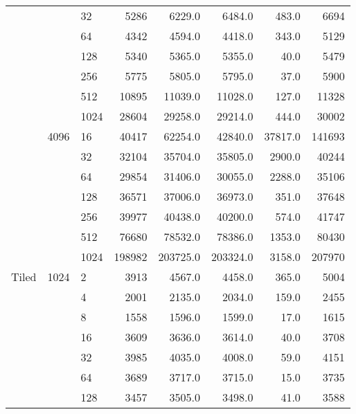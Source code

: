 \begin{tabular}{lllrrrrr}
           &      & 32 &                 5286 &    6229.0 &    6484.0 &    483.0 &    6694 \\
           &      & 64 &                 4342 &    4594.0 &    4418.0 &    343.0 &    5129 \\
           &      & 128 &                 5340 &    5365.0 &    5355.0 &     40.0 &    5479 \\
           &      & 256 &                 5775 &    5805.0 &    5795.0 &     37.0 &    5900 \\
           &      & 512 &                10895 &   11039.0 &   11028.0 &    127.0 &   11328 \\
           &      & 1024 &                28604 &   29258.0 &   29214.0 &    444.0 &   30002 \\
           & 4096 & 16 &                40417 &   62254.0 &   42840.0 &  37817.0 &  141693 \\
           &      & 32 &                32104 &   35704.0 &   35805.0 &   2900.0 &   40244 \\
           &      & 64 &                29854 &   31406.0 &   30055.0 &   2288.0 &   35106 \\
           &      & 128 &                36571 &   37006.0 &   36973.0 &    351.0 &   37648 \\
           &      & 256 &                39977 &   40438.0 &   40200.0 &    574.0 &   41747 \\
           &      & 512 &                76680 &   78532.0 &   78386.0 &   1353.0 &   80430 \\
           &      & 1024 &               198982 &  203725.0 &  203324.0 &   3158.0 &  207970 \\
Tiled & 1024 & 2 &                 3913 &    4567.0 &    4458.0 &    365.0 &    5004 \\
           &      & 4 &                 2001 &    2135.0 &    2034.0 &    159.0 &    2455 \\
           &      & 8 &                 1558 &    1596.0 &    1599.0 &     17.0 &    1615 \\
           &      & 16 &                 3609 &    3636.0 &    3614.0 &     40.0 &    3708 \\
           &      & 32 &                 3985 &    4035.0 &    4008.0 &     59.0 &    4151 \\
           &      & 64 &                 3689 &    3717.0 &    3715.0 &     15.0 &    3735 \\
           &      & 128 &                 3457 &    3505.0 &    3498.0 &     41.0 &    3588 \\

\end{tabular}
